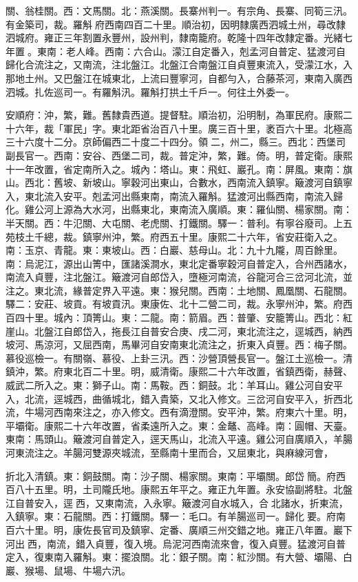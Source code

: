 \begin{pinyinscope}
關、翁桂關。西：文馬關。北：燕溪關。長寨州判一。有宗角、長寨、同筍三汛。有金築司，裁。羅斛府西南四百二十里。順治初，因明隸廣西泗城土州，尋改隸泗城府。雍正三年割置永豐州，設州判，隸南籠府。乾隆十四年改隸定番。光緒七年置。東南：老人峰。西南：六合山。濛江自定番入，剋孟河自普定、猛渡河自歸化合流注之，又南流，注北盤江。北盤江合南盤江自貞豐東流入，受濛江水，入那地土州。又巴盤江在城東北，上流曰豐寧河，自都勻入，合藤茶河，東南入廣西泗城。扎佐巡司一。有羅斛汛。羅斛打拱土千戶一。何往土外委一。

安順府：沖，繁，難。舊隸貴西道。提督駐。順治初，沿明制，為軍民府。康熙二十六年，裁「軍民」字。東北距省治百八十里。廣三百十里，袤百六十里。北極高三十六度十二分。京師偏西二十度二十四分。領二，州二，縣三。西北：西堡司副長官一。西南：安谷、西堡二司，裁。普定沖，繁，難。倚。明，普定衛。康熙十一年改置，省定南所入之。城內：塔山。東：飛虹、巖孔。南：屏風。東南：旗山。西北：舊坡、新坡山。寧穀河出東山，合數水，西南流入鎮寧。簸渡河自鎮寧入，東北流入安平。剋孟河出縣東南，南流入羅斛。猛渡河出縣西南，南流入歸化。雞公河上源為大水河，出縣東北，東南流入廣順。東：羅仙關、楊家關。南：半天關。西：牛氾關、大屯關、老虎關、打鐵關。驛一：普利。有寧谷廢司。上五苑枝土千總，裁。鎮寧州沖，繁。府西五十里。康熙二十六年，省安莊衛入之。南：玉京、青龍。東：東坡山。西：白巖、慈母山。北：九十九隴，周百餘里。南：烏泥江，源出山箐中，匯諸溪澗水，東北定番寧穀河自普定入，合州西諸水，南流入貞豐，注北盤江。簸渡河自郎岱入，墮極河南流，谷龍河合三岔河北流，並注之。東北流，緣普定界入平遠。東：猴兒關。西南：土地關、鳳凰關、石龍關。驛二：安莊、坡貢。有坡貢汛。東康佐、北十二營二司，裁。永寧州沖，繁。府西百四十里。城內：頂箐山。東：二龍。南：箭眉。西：普肇、安籠箐山。西北：紅崖山。北盤江自郎岱入，拖長江自普安合庚、戌二河，東北流注之，逕城西，納西坡河、馬涼河，又屈西南，馬畢河自安南東北流注之，折東入貞豐。西：梅子關。慕役巡檢一。有關嶺、慕役、上卦三汛。西：沙營頂營長官一。盤江土巡檢一。清鎮沖，繁。府東北百二十里。明，威清衛。康熙二十六年改置，省鎮西衛，赫聲、威武二所入之。東：獅子山。南：馬鞍。西：銅鼓。北：羊耳山。雞公河自安平入，北流，逕城西，曲循城北，錯入貴築，又北入修文。三岔河自安平入，折西北流，牛場河西南來注之，亦入修文。西有滴澄關。安平沖，繁。府東六十里。明，平壩衛。康熙二十六年改置，省柔遠所入之。東：金鼇、高峰。南：圓帽、天臺。東南：馬頭山。簸渡河自普定入，逕天馬山，北流入平遠。雞公河自廣順入，羊腸河東流注之。羊腸河雙源夾城流，至縣南十里而合，又屈東北，與麻線河會，

折北入清鎮。東：銅鼓關。南：沙子關、楊家關。東南：平壩關。郎岱簡。府西百八十五里。明，土司隴氏地。康熙五年平之。雍正九年置。永安協副將駐。北盤江自普安入，逕西，又東南流，入永寧。簸渡河自水城入，合北諸水，折東流，入鎮寧。東：石龍關。西：打鐵關。驛一：毛口。有羊腸巡司一。歸化要。府南百六十里。明，康佐長官司及鎮寧、定番、廣順三州交錯之地。雍正八年置。巖下河出西，南流，錯入貞豐，復入境。烏泥河西南流來會，復入貞豐。猛渡河自普定入，復東南入羅斛。東：擺浪關。北：銀子關。南：紅沙關。有大營、壩陽、白巖、猴場、鼠場、牛場六汛。


\end{pinyinscope}
